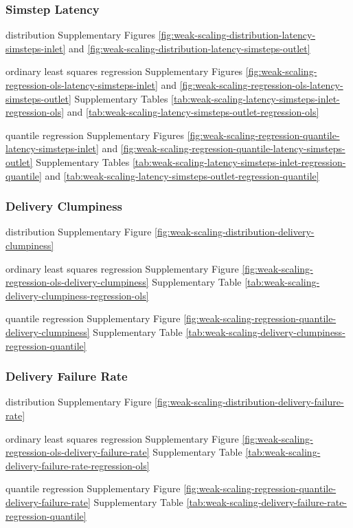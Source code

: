 \subsubsection{Simstep Latency}

distribution Supplementary Figures \ref{fig:weak-scaling-distribution-latency-simsteps-inlet} and \ref{fig:weak-scaling-distribution-latency-simsteps-outlet}

ordinary least squares regression Supplementary Figures \ref{fig:weak-scaling-regression-ols-latency-simsteps-inlet} and \ref{fig:weak-scaling-regression-ols-latency-simsteps-outlet} Supplementary Tables \ref{tab:weak-scaling-latency-simsteps-inlet-regression-ols} and \ref{tab:weak-scaling-latency-simsteps-outlet-regression-ols}

quantile regression Supplementary Figures \ref{fig:weak-scaling-regression-quantile-latency-simsteps-inlet} and \ref{fig:weak-scaling-regression-quantile-latency-simsteps-outlet}
Supplementary Tables \ref{tab:weak-scaling-latency-simsteps-inlet-regression-quantile} and \ref{tab:weak-scaling-latency-simsteps-outlet-regression-quantile}

\subsubsection{Delivery Clumpiness}

distribution Supplementary Figure \ref{fig:weak-scaling-distribution-delivery-clumpiness}

ordinary least squares regression Supplementary Figure \ref{fig:weak-scaling-regression-ols-delivery-clumpiness} Supplementary Table \ref{tab:weak-scaling-delivery-clumpiness-regression-ols}

quantile regression Supplementary Figure \ref{fig:weak-scaling-regression-quantile-delivery-clumpiness}
Supplementary Table \ref{tab:weak-scaling-delivery-clumpiness-regression-quantile}


\subsubsection{Delivery Failure Rate}

distribution Supplementary Figure \ref{fig:weak-scaling-distribution-delivery-failure-rate}

ordinary least squares regression Supplementary Figure \ref{fig:weak-scaling-regression-ols-delivery-failure-rate} Supplementary Table \ref{tab:weak-scaling-delivery-failure-rate-regression-ols}

quantile regression Supplementary Figure \ref{fig:weak-scaling-regression-quantile-delivery-failure-rate}
Supplementary Table \ref{tab:weak-scaling-delivery-failure-rate-regression-quantile}
